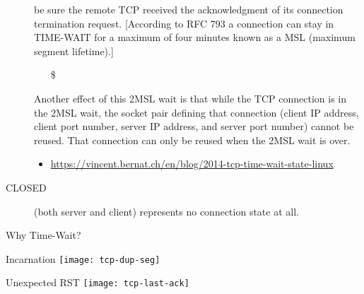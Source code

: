 \begin{description}
  be sure the remote TCP received the acknowledgment of its connection termination
  request. [According to RFC 793 a connection can stay in TIME-WAIT for a maximum of four
  minutes known as a MSL (maximum segment lifetime).]
  \begin{itemize}
  \item[\$] 
  \end{itemize}
  Another effect of this 2MSL wait is that while the TCP connection is in the 2MSL wait,
  the socket pair defining that connection (client IP address, client port number, server
  IP address, and server port number) cannot be reused. That connection can only be reused
  when the 2MSL wait is over.
  \begin{itemize}
  \item \href{Coping with the TCP TIME-WAIT state on busy Linux
      servers}{https://vincent.bernat.ch/en/blog/2014-tcp-time-wait-state-linux}
  \end{itemize}
\item[CLOSED] (both server and client) represents no connection state at all.
\end{description}

\begin{frame}{Why Time-Wait?}
  \begin{minipage}[b]{.45\linewidth}
    \begin{iblock}{Incarnation}
      \texttt{[image: tcp-dup-seg]}
    \end{iblock}
  \end{minipage}\hfill
  \begin{minipage}[b]{.45\linewidth}
    \begin{iblock}{Unexpected RST}
      \texttt{[image: tcp-last-ack]}
    \end{iblock}
  \end{minipage}  
\end{frame}

